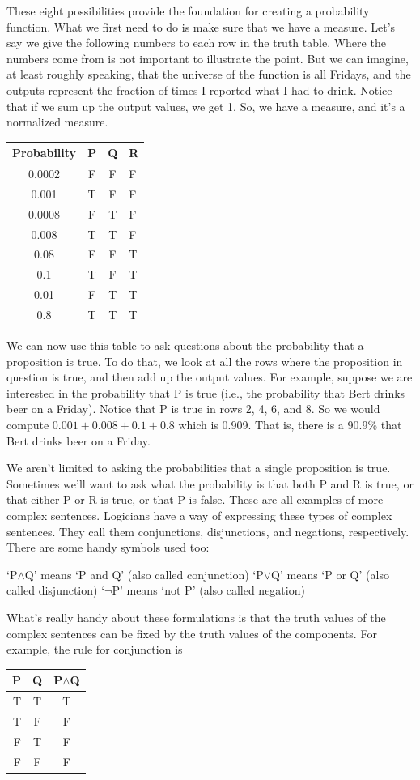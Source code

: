 \documentclass[]{tufte-book}
\begin{document}
These eight possibilities provide the foundation for creating a probability function. What we first need to do is make sure that we have a measure. Let's say we give the following numbers to each row in the truth table. Where the numbers come from is not important to illustrate the point. But we can imagine, at least roughly speaking, that the universe of the function is all Fridays, and the outputs represent the fraction of times I reported what I had to drink. Notice that if we sum up the output values, we get 1. So, we have a measure, and it's a normalized measure.

\begin{longtable}[]{@{}cccl@{}}
\toprule
Probability & P & Q & R\tabularnewline
\midrule
\endhead
0.0002 & F & F & F\tabularnewline
0.001 & T & F & F\tabularnewline
0.0008 & F & T & F\tabularnewline
0.008 & T & T & F\tabularnewline
0.08 & F & F & T\tabularnewline
0.1 & T & F & T\tabularnewline
0.01 & F & T & T\tabularnewline
0.8 & T & T & T\tabularnewline
\bottomrule
\end{longtable}

We can now use this table to ask questions about the probability that a proposition is true. To do that, we look at all the rows where the proposition in question is true, and then add up the output values. For example, suppose we are interested in the probability that P is true (i.e., the probability that Bert drinks beer on a Friday). Notice that P is true in rows 2, 4, 6, and 8. So we would compute \(0.001+0.008+0.1+0.8\) which is 0.909. That is, there is a 90.9\% that Bert drinks beer on a Friday.

We aren't limited to asking the probabilities that a single proposition is true. Sometimes we'll want to ask what the probability is that both P and R is true, or that either P or R is true, or that P is false. These are all examples of more complex sentences. Logicians have a way of expressing these types of complex sentences. They call them conjunctions, disjunctions, and negations, respectively. There are some handy symbols used too:

`P\(\wedge\)Q' means `P and Q' (also called conjunction)
`P\(\vee\)Q' means `P or Q' (also called disjunction)
`\(\neg\)P' means `not P' (also called negation)

What's really handy about these formulations is that the truth values of the complex sentences can be fixed by the truth values of the components. For example, the rule for conjunction is

\begin{longtable}[]{@{}rcc@{}}
\toprule
P & Q & P\(\wedge\)Q\tabularnewline
\midrule
\endhead
T & T & T\tabularnewline
T & F & F\tabularnewline
F & T & F\tabularnewline
F & F & F\tabularnewline
\bottomrule
\end{longtable}
\end{document}
